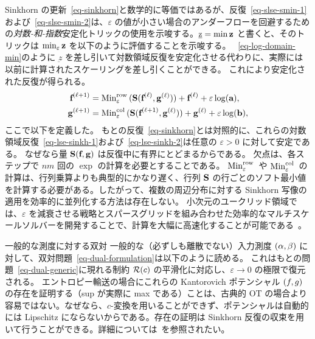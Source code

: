 \begin{rem}\label{rem-log-sinkh}
Sinkhorn の更新~\eqref{eq-sinkhorn}と数学的に等価ではあるが、反復~\eqref{eq-slse-smin-1}および~\eqref{eq-slse-smin-2}は、$\varepsilon$ の値が小さい場合のアンダーフローを回避するための\emph{対数-和-指数}安定化トリックの使用を示唆する。$\underbar{z}=\min \mathrm{\textbf{z}}$ と書くと、そのトリックは $\text{min}_\varepsilon\, \mathrm{\textbf{z}}$ を以下のように評価することを示唆する。
~\eqref{eq-log-domain-min}のように $\underbar{z}$ を差し引いて対数領域反復を安定化させる代わりに、実際には以前に計算されたスケーリングを差し引くことができる。
これにより安定化された反復が得られる。
\begin{align}
	\label{eq-lse-sinkh-1}\mathrm{\textbf{f}}^{(\ell+1)} &= \text{Min}^{\text{row}}_\varepsilon\,( \mathrm{\textbf{S}}(\mathrm{\textbf{f}}^{(\ell)},\mathrm{\textbf{g}}^{(\ell)}))  + \mathrm{\textbf{f}}^{(\ell)} + \varepsilon\log(\mathrm{\textbf{a}}), \\
	\label{eq-lse-sinkh-2}\mathrm{\textbf{g}}^{(\ell+1)} &= \text{Min}^{\text{col}}_\varepsilon\,( \mathrm{\textbf{S}}(\mathrm{\textbf{f}}^{(\ell+1)},\mathrm{\textbf{g}}^{(\ell)})) + \mathrm{\textbf{g}}^{(\ell)} + \varepsilon \log(\mathrm{\textbf{b}}),
\end{align}
ここで以下を定義した。
もとの反復~\eqref{eq-sinkhorn}とは対照的に、これらの対数領域反復~\eqref{eq-lse-sinkh-1}および~\eqref{eq-lse-sinkh-2}は任意の $\varepsilon>0$ に対して安定である。
なぜなら量 $\mathrm{\textbf{S}}(\mathrm{\textbf{f}},\mathrm{\textbf{g}})$ は反復中に有界にとどまるからである。
欠点は、各ステップで $nm$ 回の $\exp$ の計算を必要とすることである。
$\text{Min}^{\text{row}}_\varepsilon\,$ や $\text{Min}^{\text{col}}_\varepsilon\,$ の計算は、行列乗算よりも典型的にかなり遅く、行列 $\mathrm{\textbf{S}}$ の行ごとのソフト最小値を計算する必要がある。したがって、複数の周辺分布に対する Sinkhorn 写像の適用を効率的に並列化する方法は存在しない。
小次元のユークリッド領域では、$\varepsilon$ を減衰させる戦略とスパースグリッドを組み合わせた効率的なマルチスケールソルバーを開発することで、計算を大幅に高速化することが可能である~\citep{schmitzer2016stabilized}。
\end{rem}




\begin{rem2}{一般的な測度に対する双対}
一般的な（必ずしも離散でない）入力測度 $(\alpha,\beta)$ に対して、双対問題~\eqref{eq-dual-formulation}は以下のように読める。
これはもとの問題~\eqref{eq-dual-generic}に現れる制約 $\mathcal{R}(c)$ の平滑化に対応し、$\varepsilon \rightarrow 0$ の極限で復元される。
エントロピー輸送の場合にこれらの Kantorovich ポテンシャル $(f,g)$ の存在を証明する（\ie sup が実際に max である）ことは、古典的 OT の場合より容易ではない。なぜなら、$c$-変換を用いることができず、ポテンシャルは自動的には Lipschitz にならないからである。存在の証明は Sinkhorn 反復の収束を用いて行うことができる。詳細については~\citep{2016-chizat-sinkhorn}を参照されたい。
\end{rem2}




